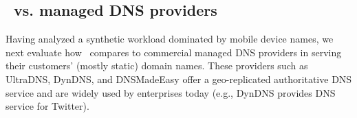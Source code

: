 \subsection{\auspice\ vs. managed DNS providers}
\label{sec:managed}


Having analyzed a synthetic workload dominated by mobile device names, we next evaluate how \auspice\ compares to commercial managed DNS providers in serving their customers' (mostly static) domain names.  These providers such as UltraDNS, DynDNS, and DNSMadeEasy \cite{ultradns, dyndns, dnsmadeeasy} offer a geo-replicated authoritative DNS service and are widely used by enterprises today (e.g., DynDNS provides DNS service for Twitter).








